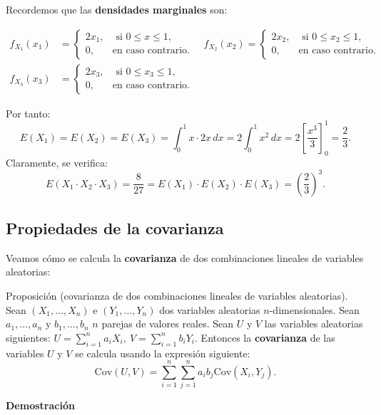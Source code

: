 \documentclass[
  letterpaper,
  DIV=11,
  numbers=noendperiod]{scrreprt}
\begin{document}
Recordemos que las \textbf{densidades marginales} son:

\[
\begin{array}{rl}
f_{X_1}(x_1) & =\begin{cases}
2x_1, & \mbox{ si }0\leq x\leq 1,\\
0, & \mbox{en caso contrario.}
\end{cases}\quad f_{X_2}(x_2)=\begin{cases}
2x_2, & \mbox{ si }0\leq x_2\leq 1,\\
0, & \mbox{en caso contrario.}
\end{cases}\\ f_{X_3}(x_3) & =\begin{cases}
2x_3, & \mbox{ si }0\leq x_3\leq 1,\\
0, & \mbox{en caso contrario.}
\end{cases}
\end{array}
\]

Por tanto: \[
E(X_1)=E(X_2)=E(X_3)=\int_0^1 x\cdot 2 x\, dx =2 \int_0^1 x^2\, dx=2\left[\frac{x^3}{3}\right]_0^1=\frac{2}{3}.
\] Claramente, se verifica: \[
E(X_1\cdot X_2\cdot X_3)=\frac{8}{27}=E(X_1)\cdot E(X_2)\cdot E(X_3)=\left(\frac{2}{3}\right)^3.
\]

\hypertarget{propiedades-de-la-covarianza-1}{%
\subsection{Propiedades de la
covarianza}\label{propiedades-de-la-covarianza-1}}

Veamos cómo se calcula la \textbf{covarianza} de dos combinaciones
lineales de variables aleatorias:

Proposición (covarianza de dos combinaciones lineales de variables
aleatorias). Sean \((X_1,\ldots,X_n)\) e \((Y_1,\ldots, Y_n)\) dos
variables aleatorias \(n\)-dimensionales. Sean \(a_1, \ldots, a_n\) y
\(b_1,\ldots, b_n\) \(n\) parejas de valores reales. Sean \(U\) y \(V\)
las variables aleatorias siguientes:
\(U=\sum\limits_{i=1}^n a_i X_i,\  V=\sum\limits_{i=1}^n b_i Y_i.\)
Entonces la \textbf{covarianza} de las variables \(U\) y \(V\) se
calcula usando la expresión siguiente: \[
\mathrm{Cov}(U,V)=\sum_{i=1}^n\sum_{j=1}^n a_i b_j \mathrm{Cov}(X_i,Y_j).
\]

\textbf{Demostración}
\end{document}
